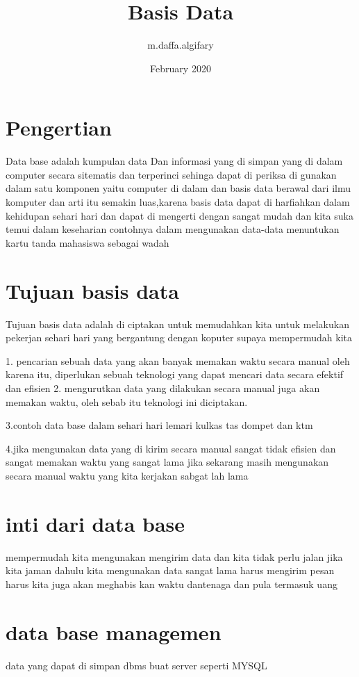 \documentclass{article}
\title{Basis Data}
\author{m.daffa.algifary}
\date{February 2020}
\begin{document}
\maketitle

\section{Pengertian }
Data base adalah kumpulan data Dan informasi yang di simpan yang di dalam computer secara sitematis dan terperinci sehinga dapat di periksa di gunakan dalam satu komponen yaitu computer di dalam dan basis data berawal dari ilmu komputer dan arti itu semakin luas,karena basis data dapat di harfiahkan dalam kehidupan sehari hari dan dapat di mengerti dengan sangat mudah dan kita suka temui dalam keseharian contohnya dalam mengunakan data-data menuntukan kartu tanda mahasiswa sebagai wadah 


\section{Tujuan basis data}
Tujuan basis data adalah di ciptakan untuk memudahkan kita untuk melakukan pekerjan sehari hari yang bergantung dengan koputer supaya mempermudah kita

1. pencarian sebuah data yang akan banyak memakan waktu secara manual oleh karena itu, diperlukan sebuah teknologi yang dapat mencari data secara efektif dan efisien
2. mengurutkan data yang dilakukan secara manual juga akan memakan waktu, oleh sebab itu teknologi ini diciptakan.

3.contoh data base dalam sehari hari lemari kulkas tas dompet dan ktm

4.jika mengunakan data yang di kirim secara manual sangat tidak efisien dan sangat memakan waktu yang sangat lama jika sekarang masih mengunakan secara manual waktu yang kita kerjakan sabgat lah lama



\section {inti dari data base}
mempermudah kita mengunakan mengirim data dan kita tidak perlu jalan jika kita jaman dahulu kita mengunakan data sangat lama harus mengirim pesan harus kita juga akan meghabis kan waktu dantenaga dan pula termasuk uang 

\section {data base managemen }
data yang dapat di simpan  dbms buat server 
seperti MYSQL
\end{document}
